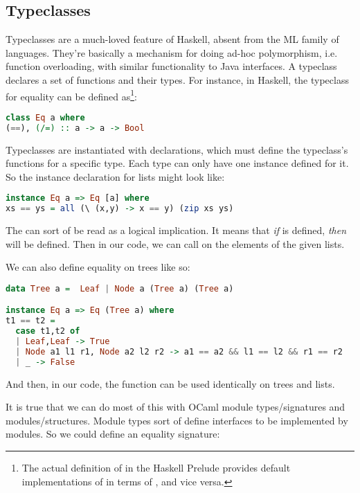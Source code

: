 \documentclass[pageno]{jpaper}
\begin{document}
{{{\subsection{Typeclasses}
Typeclasses are a much-loved feature of Haskell, absent from the ML family of languages. They're basically
a mechanism for doing ad-hoc polymorphism, i.e. function overloading, with similar functionality to
Java interfaces. A typeclass declares a set of functions and their types.
For instance, in Haskell, the  typeclass for equality can be defined as\footnote{The actual
definition of  in the Haskell Prelude provides default implementations of \lstiH{/=} in terms of \lstiH{==}, and vice versa.}:

\begin{lstlisting}[language=Haskell]
class Eq a where
(==), (/=) :: a -> a -> Bool
\end{lstlisting}

Typeclasses are instantiated with  declarations, which must define the typeclass's functions for a specific type.  Each type can only have one instance defined for it. So the
instance declaration for lists might look like:

\begin{lstlisting}[language=Haskell]
instance Eq a => Eq [a] where
xs == ys = all (\ (x,y) -> x == y) (zip xs ys)
\end{lstlisting}

The \lstiH{=>} can sort of be read as a logical implication. It means that \textit{if}  is defined, \textit{then}  will be defined.
Then in our code, we can call \lstiH{==} on the elements of the given lists.

We can also define equality on trees like so:

\begin{lstlisting}[language=Haskell]
data Tree a =  Leaf | Node a (Tree a) (Tree a)

instance Eq a => Eq (Tree a) where
t1 == t2 =
  case t1,t2 of
  | Leaf,Leaf -> True
  | Node a1 l1 r1, Node a2 l2 r2 -> a1 == a2 && l1 == l2 && r1 == r2
  | _ -> False
\end{lstlisting}

And then, in our code, the \lstiH{==} function can be used identically on trees and lists.

It is true that we can do most of this with OCaml module types/signatures and modules/structures. Module types sort of define interfaces to be implemented by modules. So we could define an equality signature:

}}}
\end{document}
